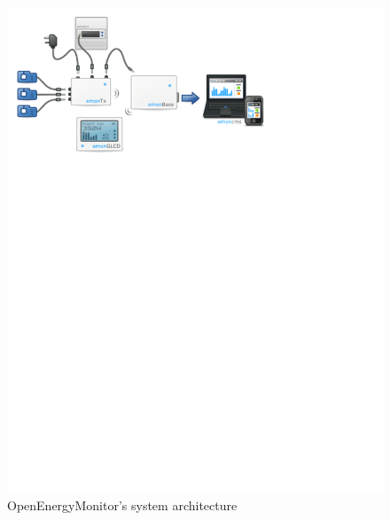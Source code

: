 \setcounter{figure}{1}
\begin{figure}[H]
\centering
\includegraphics[width=\textwidth, trim=0.5cm 19cm 6.5cm 0cm, clip]{ch/prestudy/fig/OEM_system.pdf}
\caption{OpenEnergyMonitor's system architecture}
\label{fig:oem}
\end{figure}




\newpage


